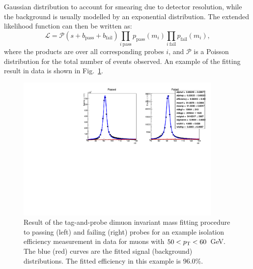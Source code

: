 Gaussian distribution to account for smearing due to detector resolution, while 
the background is usually modelled by an exponential distribution.
The extended likelihood function can then be written as:
\begin{equation}
\mathcal{L} = \mathcal{P}(s + b_{\mathrm{pass}} + b_{\mathrm{fail}})  
\prod_{i~\mathrm{pass}} p_{\mathrm{pass}}(m_i) \prod_{i~\mathrm{fail}} 
p_{\mathrm{fail}}(m_i), 
\end{equation}
where the products are over all corresponding probes $i$, and $\mathcal{P}$ is 
a Poisson distribution for the total number of events observed.
An example of the fitting result in data is shown in Fig.~\ref{fig:tnp}.

\begin{figure}[h]
\label{fig:tnp}
\includegraphics[width=0.9\textwidth]{figs/analysis/muonIsolationTight_mll_all_muonDefaultPtBins_pt50-60_Data}
\caption{Result of the tag-and-probe dimuon invariant mass fitting procedure to 
passing (left) and failing (right) probes for an example isolation efficiency 
measurement in data for muons with $50<{p_{\text T}}<60$~GeV. The blue (red) curves are 
the fitted signal (background) distributions. The fitted efficiency in this 
example is 96.0\%.}
\end{figure}

